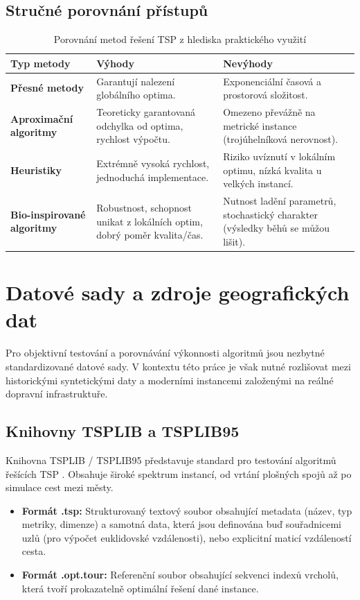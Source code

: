 \subsection{Stručné porovnání přístupů}
\begin{table}[h]
\centering
\renewcommand{\arraystretch}{1.3} %
\begin{tabular}{|p{3cm}|p{4.5cm}|p{4.5cm}|}
\hline
\textbf{Typ metody} & \textbf{Výhody} & \textbf{Nevýhody} \\ \hline
\textbf{Přesné metody} & Garantují nalezení globálního optima. & Exponenciální časová a prostorová složitost. \\ \hline
\textbf{Aproximační algoritmy} & Teoreticky garantovaná odchylka od optima, rychlost výpočtu. & Omezeno převážně na metrické instance (trojúhelníková nerovnost). \\ \hline
\textbf{Heuristiky} & Extrémně vysoká rychlost, jednoduchá implementace. & Riziko uvíznutí v lokálním optimu, nízká kvalita u velkých instancí. \\ \hline
\textbf{Bio-inspirované algoritmy} & Robustnost, schopnost unikat z lokálních optim, dobrý poměr kvalita/čas. & Nutnost ladění parametrů, stochastický charakter (výsledky běhů se můžou lišit). \\ \hline
\end{tabular}
\caption{Porovnání metod řešení TSP z hlediska praktického využití}
\label{tab:srovnani_metod}
\end{table}

\section{Datové sady a zdroje geografických dat}
Pro objektivní testování a porovnávání výkonnosti algoritmů jsou nezbytné standardizované datové sady. V kontextu této práce je však nutné rozlišovat mezi historickými syntetickými daty a moderními instancemi založenými na reálné dopravní infrastruktuře.

\subsection{Knihovny TSPLIB a TSPLIB95}
Knihovna TSPLIB / TSPLIB95 \cite{tsplib95} představuje standard pro testování algoritmů řešících TSP \cite{reinelt1994tsplib,tsplib95}. Obsahuje široké spektrum instancí, od vrtání plošných spojů až po simulace cest mezi městy.
\begin{itemize}
    \item \textbf{Formát .tsp:} Strukturovaný textový soubor obsahující metadata (název, typ metriky, dimenze) a samotná data, která jsou definována buď souřadnicemi uzlů (pro výpočet euklidovské vzdálenosti), nebo explicitní maticí vzdáleností cesta.
    \item \textbf{Formát .opt.tour:} Referenční soubor obsahující sekvenci indexů vrcholů, která tvoří prokazatelně optimální řešení dané instance.
\end{itemize}

